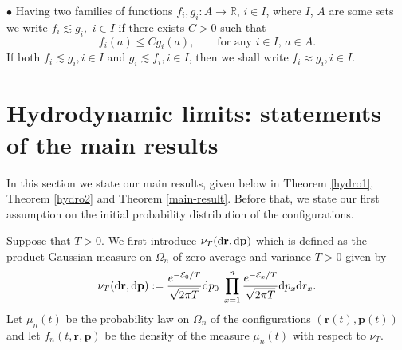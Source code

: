 \documentclass[EJP]{ejpecp} %
\newcommand{\mc}[1]{{\mathcal #1}}
\newcommand\R{{\mathbb R}}
\renewcommand{\le}{\leqslant}
\newcommand{\dd  }{\mathrm{d}}
\numberwithin{equation}{section}
\begin{document}

$\bullet$ Having two families of functions $f_i,g_i:A\to\R$, $i\in I$, where $I$,
$A$ are some sets
we write $
f_i\lesssim g_i,$ $ i\in I $
if there exists $C>0$ such that
$$
f_i(a)\le C g_i(a),\qquad \text{for any } i\in I,\,a\in A.
$$
If both $f_i\lesssim g_i, i\in I$ and $g_i\lesssim f_i, i\in
I$, then we shall write
$
f_i\approx g_i, i\in I.
$
 







\section{Hydrodynamic limits: statements of the main results}

\label{sec3}

In this section we state our main results, given below in Theorem \ref{hydro1}, Theorem \ref{hydro2} and Theorem \ref{main-result}. Before that,  {we state} our first assumption on the initial probability distribution of the configurations.

Suppose that $T>0$. {We first introduce} $\nu_T (\dd{\bf r},\dd{\bf p})$ {which is defined as} the product
  Gaussian measure on $\Omega_n$
 of {zero} average and variance $T>0$ given by
\begin{equation} \label{eq:nuT}
 \nu_T (\dd{\bf r},\dd{\bf p}) : =\frac{e^{-\mc E_0/T}}{\sqrt{2\pi T}} \dd p_0 \;
  \prod_{x=1}^n \frac{e^{-\mc E_x/T}}{\sqrt{2\pi T}} \dd p_x \dd r_x.
\end{equation} Let  $\mu_n(t)$ be the probability law on $\Omega_n$ of the configurations $(\mathbf{r}(t),\mathbf{p}(t))$ and let $f_n(t,\mathbf{r},\mathbf{p})$ be the density of the measure $\mu_n(t)$ with respect to $\nu_T$.   
\end{document}
